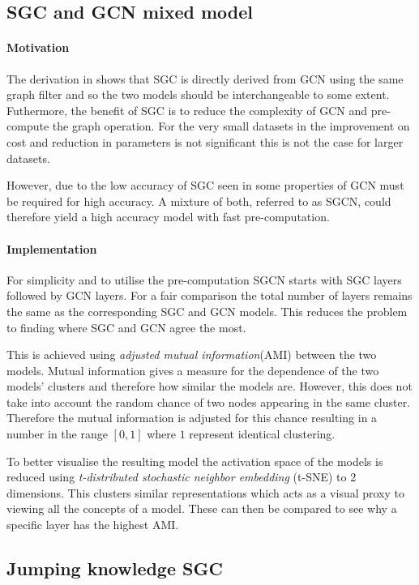 \subsection{SGC and GCN mixed model}
\label{sec:SGCN}
\paragraph{Motivation}
The derivation in  shows that SGC is directly derived from GCN using the same graph filter and so the two models should be interchangeable to some extent.
Futhermore, the benefit of SGC is to reduce the complexity of GCN and pre-compute the graph operation.
For the very small datasets in  the improvement on cost and reduction in parameters is not significant this is not the case for larger datasets.

However, due to the low accuracy of SGC seen in  some properties of GCN must be required for high accuracy.
A mixture of both, referred to as SGCN, could therefore yield a high accuracy model with fast pre-computation.

\paragraph{Implementation}
For simplicity and to utilise the pre-computation SGCN starts with SGC layers followed by GCN layers.
For a fair comparison the total number of layers remains the same as the corresponding SGC and GCN models.
This reduces the problem to finding where SGC and GCN agree the most.

This is achieved using \emph{adjusted mutual information}(AMI) between the two models.
Mutual information gives a measure for the dependence of the two models' clusters and therefore how similar the models are.
However, this does not take into account the random chance of two nodes appearing in the same cluster.
Therefore the mutual information is adjusted for this chance resulting in a number in the range $[0, 1]$ where $1$ represent identical clustering.

To better visualise the resulting model the activation space of the models is reduced using \emph{t-distributed stochastic neighbor embedding} (t-SNE) to 2 dimensions.
This clusters similar representations which acts as a visual proxy to viewing all the concepts of a model.
These can then be compared to see why a specific layer has the highest AMI.

\subsection{Jumping knowledge SGC}
